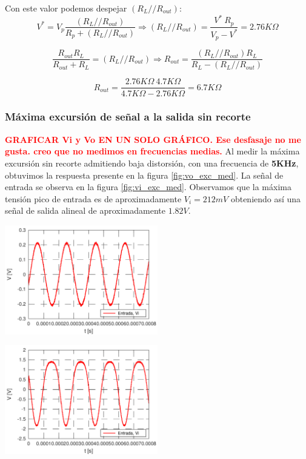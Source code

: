\documentclass[a4paper, 10pt, spanish]{article}
\begin{document}
Con este valor podemos despejar $(R_L//R_{out})$:
\begin{equation}
  V^*=V_p \frac{(R_L//R_{out})}{R_p + (R_L//R_{out})} \Rightarrow (R_L//R_{out}) = \frac{V^*\ R_p}{V_p-V^*} = 2.76K\Omega
\end{equation}

\begin{equation}
  \frac{R_{out}R_L}{R_{out}+R_L} = (R_L//R_{out})  \Rightarrow R_{out}=\frac{(R_L//R_{out}) R_L}{R_L - (R_L//R_{out})}
\end{equation}

\begin{equation}
  R_{out}=\frac{2.76K\Omega\ 4.7K\Omega}{4.7K\Omega - 2.76K\Omega}=6.7K\Omega
\end{equation}

\subsubsection{Máxima excursión de señal a la salida sin recorte}
\textbf{\textcolor{red}{GRAFICAR Vi y Vo EN UN SOLO GRÁFICO. Ese desfasaje no me gusta. creo que no medimos en frecuencias medias.}}
Al medir la máxima excursión sin recorte admitiendo baja distorsión, con una frecuencia de \textbf{5KHz}, obtuvimos la respuesta presente en la figura \ref{fig:vo_exc_med}. La señal de entrada se observa en la figura \ref{fig:vi_exc_med}. Observamos que la máxima tensión pico de entrada es de aproximadamente $V_i=212mV$ obteniendo así una señal de salida alineal de aproximadamente $1.82V$.

\begin{center}
  \includegraphics[width=0.5\textwidth]{vi3.png}
  \label{fig:vi_exc_med}
\end{center}

\begin{center}
  \includegraphics[width=0.5\textwidth]{vo3.png}
  \label{fig:vo_exc_med}
\end{center}
\end{document}
